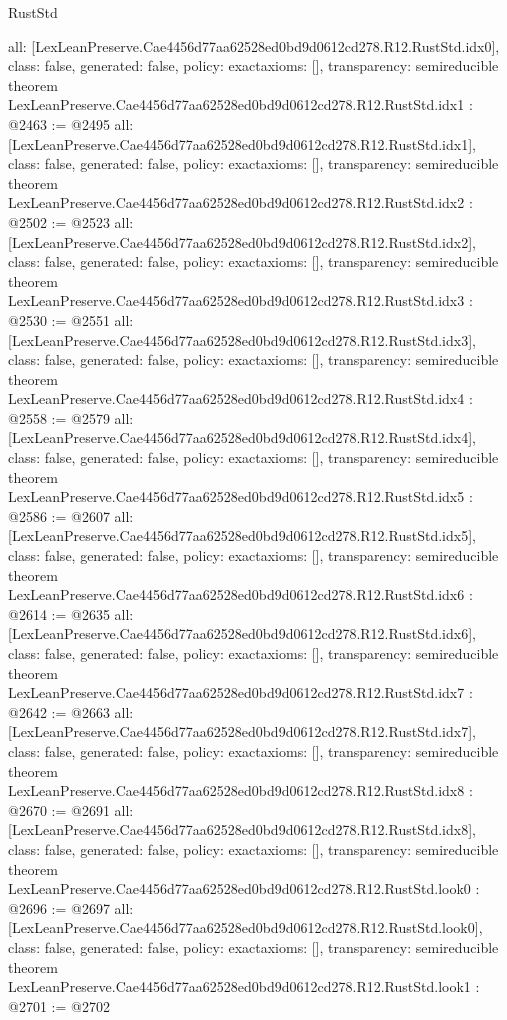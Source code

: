 \begin{lexlean}{RustStd}
\begin{coremodule}
{  all: [LexLeanPreserve.Cae4456d77aa62528ed0bd9d0612cd278.R12.RustStd.idx0],
  class: false,
  generated: false,
  policy: exact{axioms: []},
  transparency: semireducible
}
theorem LexLeanPreserve.Cae4456d77aa62528ed0bd9d0612cd278.R12.RustStd.idx1 : @2463 := @2495 {
  all: [LexLeanPreserve.Cae4456d77aa62528ed0bd9d0612cd278.R12.RustStd.idx1],
  class: false,
  generated: false,
  policy: exact{axioms: []},
  transparency: semireducible
}
theorem LexLeanPreserve.Cae4456d77aa62528ed0bd9d0612cd278.R12.RustStd.idx2 : @2502 := @2523 {
  all: [LexLeanPreserve.Cae4456d77aa62528ed0bd9d0612cd278.R12.RustStd.idx2],
  class: false,
  generated: false,
  policy: exact{axioms: []},
  transparency: semireducible
}
theorem LexLeanPreserve.Cae4456d77aa62528ed0bd9d0612cd278.R12.RustStd.idx3 : @2530 := @2551 {
  all: [LexLeanPreserve.Cae4456d77aa62528ed0bd9d0612cd278.R12.RustStd.idx3],
  class: false,
  generated: false,
  policy: exact{axioms: []},
  transparency: semireducible
}
theorem LexLeanPreserve.Cae4456d77aa62528ed0bd9d0612cd278.R12.RustStd.idx4 : @2558 := @2579 {
  all: [LexLeanPreserve.Cae4456d77aa62528ed0bd9d0612cd278.R12.RustStd.idx4],
  class: false,
  generated: false,
  policy: exact{axioms: []},
  transparency: semireducible
}
theorem LexLeanPreserve.Cae4456d77aa62528ed0bd9d0612cd278.R12.RustStd.idx5 : @2586 := @2607 {
  all: [LexLeanPreserve.Cae4456d77aa62528ed0bd9d0612cd278.R12.RustStd.idx5],
  class: false,
  generated: false,
  policy: exact{axioms: []},
  transparency: semireducible
}
theorem LexLeanPreserve.Cae4456d77aa62528ed0bd9d0612cd278.R12.RustStd.idx6 : @2614 := @2635 {
  all: [LexLeanPreserve.Cae4456d77aa62528ed0bd9d0612cd278.R12.RustStd.idx6],
  class: false,
  generated: false,
  policy: exact{axioms: []},
  transparency: semireducible
}
theorem LexLeanPreserve.Cae4456d77aa62528ed0bd9d0612cd278.R12.RustStd.idx7 : @2642 := @2663 {
  all: [LexLeanPreserve.Cae4456d77aa62528ed0bd9d0612cd278.R12.RustStd.idx7],
  class: false,
  generated: false,
  policy: exact{axioms: []},
  transparency: semireducible
}
theorem LexLeanPreserve.Cae4456d77aa62528ed0bd9d0612cd278.R12.RustStd.idx8 : @2670 := @2691 {
  all: [LexLeanPreserve.Cae4456d77aa62528ed0bd9d0612cd278.R12.RustStd.idx8],
  class: false,
  generated: false,
  policy: exact{axioms: []},
  transparency: semireducible
}
theorem LexLeanPreserve.Cae4456d77aa62528ed0bd9d0612cd278.R12.RustStd.look0 : @2696 := @2697 {
  all: [LexLeanPreserve.Cae4456d77aa62528ed0bd9d0612cd278.R12.RustStd.look0],
  class: false,
  generated: false,
  policy: exact{axioms: []},
  transparency: semireducible
}
theorem LexLeanPreserve.Cae4456d77aa62528ed0bd9d0612cd278.R12.RustStd.look1 : @2701 := @2702 {
}
\end{coremodule}
\end{lexlean}
